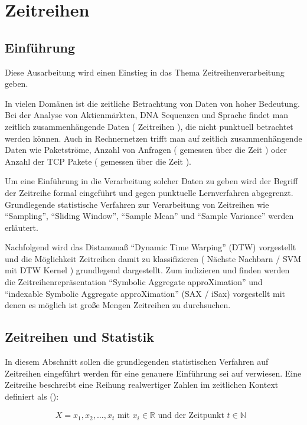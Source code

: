 \section{Zeitreihen}
\label{sec:compositions:timeanalysis}
\subsection{Einführung} Diese Ausarbeitung wird einen Einstieg in das
Thema Zeitreihenverarbeitung geben.

In vielen Domänen ist die zeitliche Betrachtung von Daten von hoher
Bedeutung. Bei der Analyse von Aktienmärkten, DNA Sequenzen und
Sprache findet man zeitlich zusammenhängende Daten ( Zeitreihen ), die
nicht punktuell betrachtet werden können. Auch in Rechnernetzen trifft
man auf zeitlich zusammenhängende Daten wie Paketströme, Anzahl von
Anfragen ( gemessen über die Zeit ) oder Anzahl der TCP Pakete (
gemessen über die Zeit ).

Um eine Einführung in die Verarbeitung solcher Daten zu geben wird der
Begriff der Zeitreihe formal eingeführt und gegen punktuelle
Lernverfahren abgegrenzt. Grundlegende statistische Verfahren zur
Verarbeitung von Zeitreihen wie ``Sampling'', ``Sliding Window'',
``Sample Mean'' und ``Sample Variance'' werden erläutert.

Nachfolgend wird das Distanzmaß ``Dynamic Time Warping'' (DTW)
vorgestellt und die Möglichkeit Zeitreihen damit zu klassifizieren (
Nächste Nachbarn / SVM mit DTW Kernel ) grundlegend dargestellt. Zum
indizieren und finden werden die Zeitreihenrepräsentation ``Symbolic
Aggregate approXimation'' und ``indexable Symbolic Aggregate
approXimation'' (SAX / iSax) vorgestellt mit denen es möglich ist
große Mengen Zeitreihen zu durchsuchen.

\subsection{Zeitreihen und Statistik} In diesem Abschnitt sollen die
grundlegenden statistischen Verfahren auf Zeitreihen eingeführt werden
für eine genauere Einführung sei auf \cite{ts, gama} verwiesen.  Eine
Zeitreihe beschreibt eine Reihung realwertiger Zahlen im zeitlichen
Kontext definiert als (\cite{shieh08}):

\begin{align}
  X = x_1, x_2, \ldots,  x_t \text{ mit $x_i \in \mathbb{R}$ und der
    Zeitpunkt $t \in \mathbb{N}$ }
\end{align}

